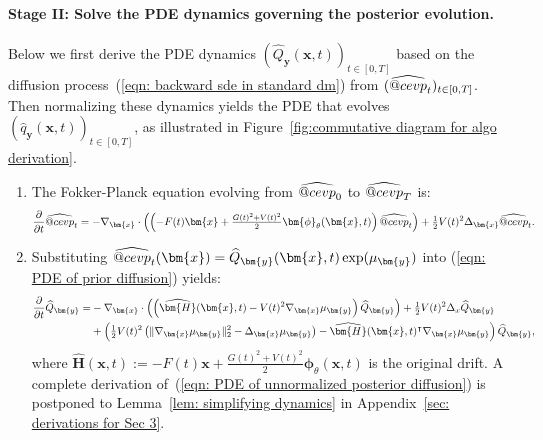 \documentclass{article}
\makeatletter
\numberwithin{equation}{section}
\def\eqref#1{(\ref{#1})}
\def\vx{{\bm{x}}}
\def\vy{{\bm{y}}}
\def\vphi{{\bm{\phi}}}
\def\mH{{\bm{H}}}
\DeclareRobustCommand{\cev}[1]{%
  {\mathpalette\do@cev{#1}}%
}
\newcommand{\do@cev}[2]{%
  \vbox{\offinterlineskip
    \sbox\z@{$\m@th#1 x$}%
    \ialign{##\cr
      \hidewidth\reflectbox{$\m@th#1\vec{}\mkern4mu$}\hidewidth\cr
      \noalign{\kern-\ht\z@}
      $\m@th#1#2$\cr
    }%
  }%
}
\makeatother
\begin{document}
\paragraph{Stage II: Solve the PDE dynamics governing the posterior evolution.}

Below we first derive the PDE dynamics $(\widehat{Q}_{\vy}(\vx,t))_{t\in[0, T]}$ based on the diffusion process~\eqref{eqn: backward sde in standard dm} from $(\widehat{\cev{p}}_t)_{t\in[0, T]}$. Then normalizing these dynamics yields the PDE that evolves $(\widehat{q}_{\vy}(\vx,t))_{t\in[0, T]}$, as illustrated in Figure~\ref{fig:commutative diagram for algo derivation}. 

\begin{enumerate}[leftmargin=*, topsep=0pt, itemsep=2pt, wide]
    \item The Fokker-Planck equation evolving from $\widehat{\cev{p}}_0$ to $\widehat{\cev{p}}_T$ is:
    \begin{equation}
        \setlength{\abovedisplayskip}{3pt}
        \setlength{\belowdisplayskip}{3pt}
        \label{eqn: PDE of prior diffusion}
        \frac{\partial}{\partial t}\widehat{\cev{p}}_t = -\nabla_{\vx} \cdot \left(\left(-F(t)\vx + \tfrac{G(t)^2 + V(t)^2}{2} \vphi_\theta(\vx,t)\right)\widehat{\cev{p}}_t\right) + \tfrac{1}{2}V(t)^2\Delta_{\vx}\widehat{\cev{p}}_t.
    \end{equation}
    
    \item Substituting $\widehat{\cev{p}}_t(\vx) = \widehat{Q}_{\vy}(\vx,t)\exp(\mu_{\vy})$ into \eqref{eqn: PDE of prior diffusion} yields:
    \begin{equation}
        \setlength{\abovedisplayskip}{3pt}
        \setlength{\belowdisplayskip}{3pt}
        \label{eqn: PDE of unnormalized posterior diffusion}
        \begin{aligned}
        \frac{\partial}{\partial t}\widehat{Q}_{\vy} = &-\nabla_{\vx} \cdot \left(\left(\widehat{\mH}(\vx,t)-V(t)^2\nabla_{\vx}\mu_{\vy}\right)\widehat{Q}_{\vy}\right)
        +\tfrac{1}{2}V(t)^2\Delta_{x}\widehat{Q}_{\vy}\\
        &+\left(\tfrac{1}{2}V(t)^2\left(\|\nabla_{\vx}\mu_{\vy}\|_2^2-\Delta_{\vx}\mu_{\vy}\right) - \widehat{\mH}(\vx,t)^\intercal\nabla_{\vx}\mu_{\vy}\right)\widehat{Q}_{\vy},
        \end{aligned}    
    \end{equation}
    where $\widehat{\mH}(\vx,t) := -F(t)\vx + \frac{G(t)^2 + V(t)^2}{2} \vphi_\theta(\vx,t)$ is the original drift. A complete derivation of~\eqref{eqn: PDE of unnormalized posterior diffusion} is postponed to Lemma~\ref{lem: simplifying dynamics} in Appendix~\ref{sec: derivations for Sec 3}.
    

\end{enumerate}
\end{document}
